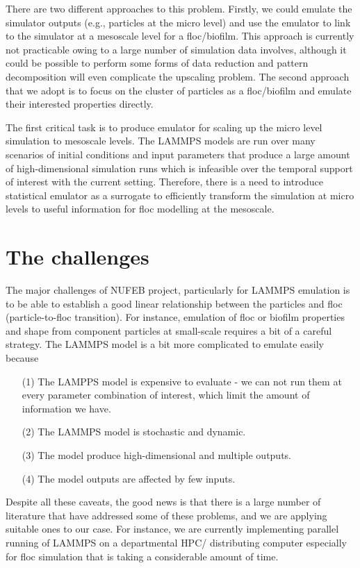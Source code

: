 \documentclass[12pt,titlepage]{report}
\theoremstyle{definition}
\theoremstyle{remark}
\begin{document}
There are two different approaches to this problem. Firstly, we could emulate the simulator outputs (e.g., particles at the micro level) and use the emulator to link to the simulator at a mesoscale level for a floc/biofilm. This approach is currently not practicable owing to a large number of simulation data involves, although it could be possible to perform some forms of data reduction and pattern decomposition will even complicate the upscaling problem. The second approach that we adopt is to focus on the cluster of particles as a floc/biofilm and emulate their interested properties directly. 

The first critical task is to produce emulator for scaling up the micro level simulation to mesoscale levels. The LAMMPS models are run over many scenarios of initial conditions and input parameters that produce a large amount of high-dimensional simulation runs which is infeasible over the temporal support of interest with the current setting. Therefore, there is a need to introduce statistical emulator as a surrogate to efficiently transform the simulation at micro levels to useful information for floc modelling at the mesoscale. 

\section{The challenges}
The major challenges of NUFEB project, particularly for LAMMPS emulation is to be able to establish a good linear relationship between the particles and floc (particle-to-floc transition). For instance, emulation of floc or biofilm properties and shape from component particles at small-scale requires a bit of a careful strategy. The LAMMPS model is a bit more complicated to emulate easily because

\begin{itemize}
\item[(1)] The LAMPPS model is expensive to evaluate - we can not run them at every parameter combination of interest, which limit the amount of information we have.
\item[(2)] The LAMMPS model is stochastic and dynamic. 
\item[(3)] The model produce high-dimensional and multiple outputs.
\item[(4)] The model outputs are affected by few inputs.
\end{itemize}
Despite all these caveats, the good news is that there is a large number of literature that have addressed some of these problems, and we are applying suitable ones to our case. For instance, we are currently implementing parallel running of LAMMPS on a departmental HPC/ distributing computer especially for floc simulation that is taking a considerable amount of time.
\end{document}
